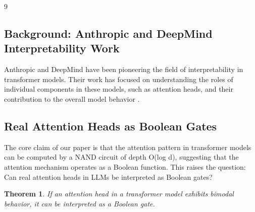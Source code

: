 \documentclass[11pt]{article}
\newtheorem{theorem}{Theorem}[section]
\theoremstyle{definition}
\begin{document}
\begin{thebibliography}{9}
\subsection{Background: Anthropic and DeepMind Interpretability Work}






Anthropic and DeepMind have been pioneering the field of interpretability in transformer models. Their work has focused on understanding the roles of individual components in these models, such as attention heads, and their contribution to the overall model behavior \cite{anthropic2020, deepmind2020}.













\subsection{Real Attention Heads as Boolean Gates}






The core claim of our paper is that the attention pattern in transformer models can be computed by a NAND circuit of depth O(log d), suggesting that the attention mechanism operates as a Boolean function. This raises the question: Can real attention heads in LLMs be interpreted as Boolean gates?













\begin{theorem}






If an attention head in a transformer model exhibits bimodal behavior, it can be interpreted as a Boolean gate.






\end{theorem}














\end{thebibliography}
\end{document}
